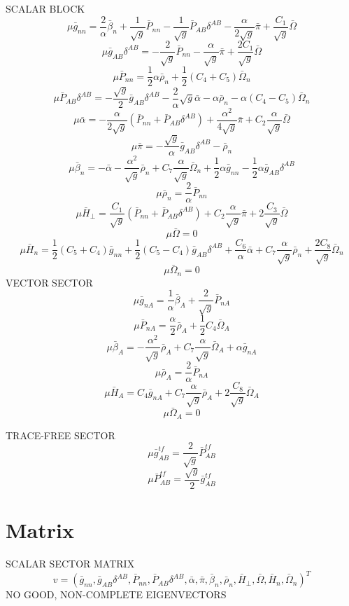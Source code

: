 \documentclass{article}
\begin{document}
SCALAR BLOCK
\[
\mu {\bar g}_{nn} = \frac{2}{\alpha} {\bar \beta}_{n} + \frac{1}{\sqrt{g}}{\bar P}_{nn} - \frac{1}{\sqrt{g}}{\bar P}_{AB}\delta^{AB} - \frac{\alpha}{2\sqrt{g}}{\bar \pi} + \frac{C_{1}}{\sqrt{g}}{\bar \Omega}
\]
\[
\mu {\bar g}_{AB}\delta^{AB} = -\frac{2}{\sqrt{g}}{\bar P}_{nn} - \frac{\alpha}{\sqrt{g}}{\bar \pi} + \frac{2C_{1}}{\sqrt{g}}{\bar \Omega} 
\]
\[
\mu {\bar P}_{nn} = \frac{1}{2}\alpha {\bar \rho}_{n} + \frac{1}{2}(C_{4} + C_{5}){\bar \Omega}_{n}
\]
\[
\mu {\bar P}_{AB}\delta^{AB} = -\frac{\sqrt{g}}{2}{\bar g}_{AB}\delta^{AB} - \frac{2}{\alpha}\sqrt{g}{\bar \alpha} - \alpha {\bar \rho}_{n} - \alpha(C_{4} - C_{5}){\bar \Omega}_{n} 
\]
\[
\mu {\bar \alpha} = -\frac{\alpha}{2\sqrt{g}}({\bar P}_{nn} + {\bar P}_{AB}\delta^{AB}) + \frac{\alpha^{2}}{4\sqrt{g}}{\bar \pi} + C_{2}\frac{\alpha}{\sqrt{g}}{\bar \Omega}
\]
\[
\mu {\bar \pi} = -\frac{\sqrt{g}}{\alpha} {\bar g}_{AB}\delta^{AB} - {\bar \rho}_{n}
\]
\[
\mu {\bar \beta}_{n} = - {\bar \alpha} - \frac{\alpha^{2}}{\sqrt{g}}{\bar \rho}_{n} + C_{7}\frac{\alpha}{\sqrt{g}}{\bar \Omega}_{n} + \frac{1}{2}\alpha {\bar g}_{nn} - \frac{1}{2}\alpha {\bar g}_{AB}\delta^{AB}
\]
\[
\mu {\bar \rho}_{n} = \frac{2}{\alpha}{\bar P}_{nn}
\]
\[
\mu {\bar H}_{\perp} = \frac{C_{1}}{\sqrt{g}}\left({\bar P}_{nn} + {\bar P}_{AB}\delta^{AB}\right) + C_{2}\frac{\alpha}{\sqrt{g}}{\bar \pi} + 2\frac{C_{3}}{\sqrt{g}}{\bar \Omega}
\]
\[
\mu {\bar \Omega} = 0
\]
\[
\mu {\bar H}_{n} = \frac{1}{2}(C_{5} + C_{4}){\bar g}_{nn} + \frac{1}{2}(C_{5} - C_{4}){\bar g}_{AB}\delta^{AB} + \frac{C_{6}}{\alpha}{\bar \alpha} + C_{7}\frac{\alpha}{\sqrt{g}}{\bar \rho}_{n} + \frac{2C_{8}}{\sqrt{g}}{\bar \Omega}_{n}
\]
\[
\mu {\bar \Omega}_{n} = 0
\]
VECTOR SECTOR
\[
\mu {\bar g}_{nA} = \frac{1}{\alpha}{\bar \beta}_{A} + \frac{2}{\sqrt{g}}{\bar P}_{nA}
\]
\[
\mu {\bar P}_{nA} = \frac{\alpha}{2}{\bar \rho}_{A} + \frac{1}{2}C_{4}{\bar \Omega}_{A}
\]
\[
\mu {\bar \beta}_{A} = -\frac{\alpha^{2}}{\sqrt{g}}{\bar \rho}_{A} + C_{7}\frac{\alpha}{\sqrt{g}}{\bar \Omega}_{A} + \alpha {\bar g}_{nA}
\]
\[
\mu {\bar \rho}_{A} = \frac{2}{\alpha}{\bar P}_{nA}
\]
\[
\mu {\bar H}_{A} = C_{4}{\bar g}_{nA} + C_{7}\frac{\alpha}{\sqrt{g}}{\bar \rho}_{A} + 2\frac{C_{8}}{\sqrt{g}}{\bar \Omega}_{A}
\]
\[
\mu {\bar \Omega}_{A} = 0
\]

TRACE-FREE SECTOR
\[
\mu {\bar g}^{tf}_{AB} = \frac{2}{\sqrt{g}}{\bar P}^{tf}_{AB} 
\]
\[
\mu {\bar P}^{tf}_{AB} = \frac{\sqrt{g}}{2}{\bar g}^{tf}_{AB}
\]
\section{Matrix}
SCALAR SECTOR MATRIX
\[
v =( {\bar g}_{nn}, {\bar g}_{AB}\delta^{AB}, {\bar P}_{nn}, {\bar P}_{AB}\delta^{AB}, {\bar \alpha}, {\bar \pi}, {\bar \beta}_{n}, {\bar \rho}_{n}, {\bar H}_{\perp}, {\bar \Omega}, {\bar H}_{n}, {\bar \Omega}_{n})^{T}
\] 
NO GOOD, NON-COMPLETE EIGENVECTORS
\end{document}
